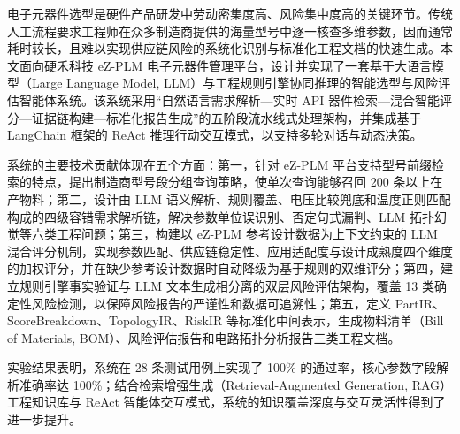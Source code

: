 
电子元器件选型是硬件产品研发中劳动密集度高、风险集中度高的关键环节。传统人工流程要求工程师在众多制造商提供的海量型号中逐一核查多维参数，因而通常耗时较长，且难以实现供应链风险的系统化识别与标准化工程文档的快速生成。本文面向硬禾科技 eZ-PLM 电子元器件管理平台，设计并实现了一套基于大语言模型（Large Language Model, LLM）与工程规则引擎协同推理的智能选型与风险评估智能体系统。该系统采用“自然语言需求解析—实时 API 器件检索—混合智能评分—证据链构建—标准化报告生成”的五阶段流水线式处理架构，并集成基于 LangChain 框架的 ReAct 推理行动交互模式，以支持多轮对话与动态决策。

系统的主要技术贡献体现在五个方面：第一，针对 eZ-PLM 平台支持型号前缀检索的特点，提出制造商型号段分组查询策略，使单次查询能够召回 200 条以上在产物料；第二，设计由 LLM 语义解析、规则覆盖、电压比较兜底和温度正则匹配构成的四级容错需求解析链，解决参数单位误识别、否定句式漏判、LLM 拓扑幻觉等六类工程问题；第三，构建以 eZ-PLM 参考设计数据为上下文约束的 LLM 混合评分机制，实现参数匹配、供应链稳定性、应用适配度与设计成熟度四个维度的加权评分，并在缺少参考设计数据时自动降级为基于规则的双维评分；第四，建立规则引擎事实验证与 LLM 文本生成相分离的双层风险评估架构，覆盖 13 类确定性风险检测，以保障风险报告的严谨性和数据可追溯性；第五，定义 PartIR、ScoreBreakdown、TopologyIR、RiskIR 等标准化中间表示，生成物料清单（Bill of Materials, BOM）、风险评估报告和电路拓扑分析报告三类工程文档。

实验结果表明，系统在 28 条测试用例上实现了 100\% 的通过率，核心参数字段解析准确率达 100\%；结合检索增强生成（Retrieval-Augmented Generation, RAG）工程知识库与 ReAct 智能体交互模式，系统的知识覆盖深度与交互灵活性得到了进一步提升。

